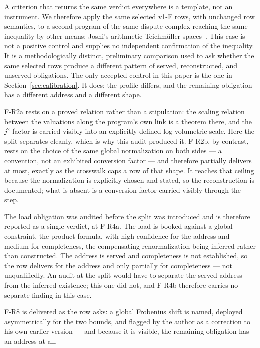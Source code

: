 \documentclass[11pt,a4paper]{article}
\begin{document}
A criterion that returns the same verdict everywhere is a template, not an
instrument. We therefore apply the same selected v1-F rows, with unchanged
row semantics, to a second program of the same dispute complex reaching
the same inequality by other means: Joshi's arithmetic Teichmüller
spaces~\cite{JoshiATSIII,JoshiATSIV}. This case is not a positive control and
supplies no independent confirmation of the inequality. It is a methodologically
distinct, preliminary comparison used to ask whether the same selected rows
produce a different pattern of served, reconstructed, and unserved obligations.
The only accepted control in this paper is the one in
Section~\ref{sec:calibration}. It does: the profile differs, and the remaining
obligation has a different address and a different shape.

F-R2a rests on a proved relation rather than a stipulation: the scaling relation
between the valuations along the program's own link is a theorem there, and the
$j^2$ factor is carried visibly into an explicitly defined log-volumetric scale.
Here the split separates cleanly, which is why this audit produced it. F-R2b, by
contrast, rests on the choice of the same global normalization on both sides ---
a convention, not an exhibited conversion factor --- and therefore partially
delivers at most, exactly as the crosswalk caps a row of that shape. It reaches
that ceiling because the normalization is explicitly chosen and stated, so the
reconstruction is documented; what is absent is a conversion factor carried
visibly through the step.

The load obligation was audited before the split was introduced and is
therefore reported as a single verdict, at F-R4a. The load is booked against a
global constraint, the product formula, with high confidence for the address
and medium for completeness, the compensating renormalization being inferred
rather than constructed. The address is served and completeness is not
established, so the row delivers for the address and only partially for
completeness --- not unqualifiedly. An audit at the split would have to
separate the served address from the inferred existence; this one did not, and
F-R4b therefore carries no separate finding in this case.

F-R8 is delivered as the row asks: a global Frobenius shift is named, deployed
asymmetrically for the two bounds, and flagged by the author as a correction to
his own earlier version --- and because it is visible, the remaining obligation
has an address at all.
\end{document}
